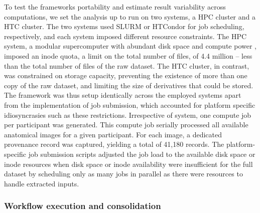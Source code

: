 To test the frameworks portability and estimate result variability across computations, we set the analysis up to run on two systems, a \gls{HPC} cluster and a \gls{HTC} cluster.
The two systems used SLURM or HTCondor for job scheduling, respectively, and each system imposed different resource constraints.
The \gls{HPC} system, a modular supercomputer with abundant disk space and compute power \citep{krause2018jureca}, imposed an inode quota, a limit on the total number of files, of 4.4 million – less than the total number of files of the raw dataset.
The \gls{HTC} cluster, in contrast, was constrained on storage capacity, preventing the existence of more than one copy of the raw dataset, and limiting the size of derivatives that could be stored.
The framework was thus setup identically across the employed systems apart from the implementation of job submission, which accounted for platform specific idiosyncrasies such as these restrictions.
Irrespective of system, one compute job per participant was generated.
This compute job serially processed all available anatomical images for a given participant.
For each image, a dedicated provenance record was captured, yielding a total of 41,180 records.
The platform-specific job submission scripts adjusted the job load to the available disk space or inode resources when disk space or inode availability were insufficient for the full dataset by scheduling only as many jobs in parallel as there were resources to handle extracted inputs.

\subsubsection{Workflow execution and consolidation}

